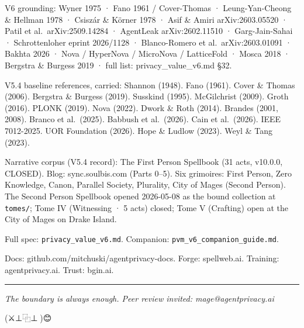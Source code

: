 \documentclass[
  11pt,
]{article}
\begin{document}
V6 grounding: Wyner 1975 · Fano 1961 / Cover-Thomas · Leung-Yan-Cheong
\& Hellman 1978 · Csiszár \& Körner 1978 · Asif \& Amiri
arXiv:2603.05520 · Patil et al.~arXiv:2509.14284 · AgentLeak
arXiv:2602.11510 · Garg-Jain-Sahai · Schrottenloher eprint 2026/1128 ·
Blanco-Romero et al.~arXiv:2603.01091 · Bakhta 2026 · Nova / HyperNova /
MicroNova / LatticeFold · Mosca 2018 · Bergstra \& Burgess 2019 · full
list: privacy\_value\_v6.md §32.

V5.4 baseline references, carried: Shannon (1948). Fano (1961). Cover \&
Thomas (2006). Bergstra \& Burgess (2019). Susskind (1995). McGilchrist
(2009). Groth (2016). PLONK (2019). Nova (2022). Dwork \& Roth (2014).
Brandes (2001, 2008). Branco et al.~(2025). Babbush et al.~(2026). Cain
et al.~(2026). IEEE 7012-2025. UOR Foundation (2026). Hope \& Ludlow
(2023). Weyl \& Tang (2023).

Narrative corpus (V5.4 record): The First Person Spellbook (31 acts,
v10.0.0, CLOSED). Blog: sync.soulbis.com (Parts 0--5). Six grimoires:
First Person, Zero Knowledge, Canon, Parallel Society, Plurality, City
of Mages (Second Person). The Second Person Spellbook opened 2026-05-08
as the bound collection at \texttt{tomes/}; Tome IV (Witnessing · 5
acts) closed; Tome V (Crafting) open at the City of Mages on Drake
Island.

Full spec: \texttt{privacy\_value\_v6.md}. Companion:
\texttt{pvm\_v6\_companion\_guide.md}.

Docs: github.com/mitchuski/agentprivacy-docs. Forge: spellweb.ai.
Training: agentprivacy.ai. Trust: bgin.ai.

\begin{center}\rule{0.5\linewidth}{0.5pt}\end{center}

\emph{The boundary is always enough. Peer review invited:
mage@agentprivacy.ai}

(⚔️⊥⿻⊥🧙)😊
\end{document}
